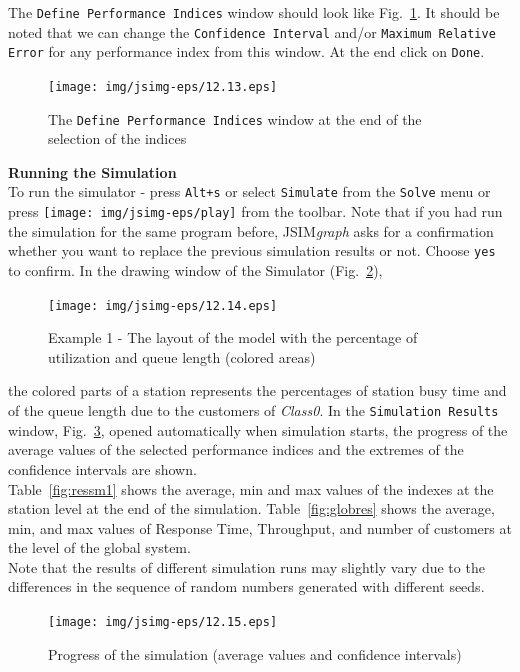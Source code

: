 The \texttt{Define Performance Indices} window should look like
Fig.~\ref{fig:globperindw}. It should be noted that we can change
the \texttt{Confidence Interval} and/or \texttt{Maximum Relative
Error} for any performance index from this window. At the end
click on \texttt{Done}.\\
\begin{figure}[htb]
    \begin{center}
        \texttt{[image: img/jsimg-eps/12.13.eps]}
    \end{center}
    \caption{The \texttt{Define Performance Indices} window at the end
    of the selection of the indices}
    \label{fig:globperindw}
\end{figure}

\noindent \textbf{Running the Simulation}\\
To run the simulator - press \texttt{Alt+s} or select
\texttt{Simulate} from the \texttt{Solve} menu or press
\texttt{[image: img/jsimg-eps/play]} from the toolbar.
Note that if you had run the simulation for the same program
before, JSIM\emph{graph} asks for a confirmation whether you want
to replace the previous simulation results or not. Choose
\texttt{yes} to confirm. In the drawing window of the Simulator
(Fig.~\ref{fig:progsimw}),
\begin{figure}[htb]
    \begin{center}
        \texttt{[image: img/jsimg-eps/12.14.eps]}
    \end{center}
    \caption{Example 1 - The layout of the model with the percentage of
    utilization and queue length (colored areas)}
    \label{fig:progsimw}
\end{figure}
the colored parts of a station represents the percentages of
station busy time and of the queue length due to the customers of
\emph{Class0}. In the \texttt{Simulation Results} window,
Fig.~\ref{fig:simres},  opened automatically when simulation
starts, the progress of the average values of the selected
performance indices and the extremes of the confidence intervals
are shown.\\ Table~\ref{fig:ressm1} shows the average, min and max
values of the indexes at the station level at the end of the
simulation. Table~\ref{fig:globres} shows the average, min, and
max values of Response Time, Throughput, and number of customers
at the level of the global system.\\
Note that the results of different simulation runs may slightly
vary due to the differences in the sequence of random numbers
generated with different seeds.
\begin{figure}[htb]
    \begin{center}
        \texttt{[image: img/jsimg-eps/12.15.eps]}
    \end{center}
    \caption{Progress of the simulation (average values and confidence
    intervals)}
    \label{fig:simres}
\end{figure}

